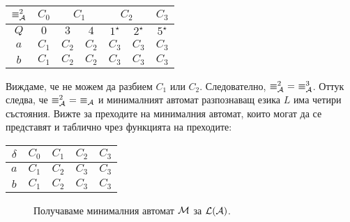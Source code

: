 \begin{extra2}
\begin{example}
\begin{itemize}
      \begin{tabular}{|c|c|c|c|c|c|c|}
        \hline
        $\equiv^2_{\mathcal{A}}$ & $C_0$ & \multicolumn{2}{|c|}{$C_1$} & \multicolumn{2}{|c|}{$C_2$} & $C_3$\\
        \hline
        \hline
        $Q$ & $0$ & $3$ & $4$ & $1^\star$ & $2^\star$ & $5^\star$ \\
        \hline
        $a$ & $C_1$& $C_2$ & $C_2$ & $C_3$ & $C_3$ & $C_3$\\
        \hline
        $b$ & $C_1$& $C_2$ & $C_2$ & $C_3$ & $C_3$ & $C_3$\\
        \hline
      \end{tabular}
      
      
      Виждаме, че не можем да разбием $C_1$ или $C_2$.
      Следователно, $\equiv^2_\A\ =\ \equiv^3_\A$.
      Оттук следва, че $\equiv^2_{\mathcal{A}}\ =\ \equiv_{\mathcal{A}}$ и минималният автомат разпознаващ езика $L$
      има четири състояния. Вижте  за преходите на минималния автомат,
      които могат да се представят и таблично чрез функцията на преходите:

      \begin{tabular}{|c|c|c|c|c|}
        \hline
        $\delta$ & $C_0$ & $C_1$ & $C_2$ & $C_3$ \\
        \hline
        $a$ & $C_1$ & $C_2$ & $C_3$ & $C_3$ \\
        \hline
        $b$ & $C_1$ & $C_2$ & $C_3$ & $C_3$ \\
        \hline
      \end{tabular}
    \end{itemize}

    \begin{figure}[H]
      \centering
      \caption{Получаваме минималния автомат $\mathcal{M}$ за $\mathcal{L}(\mathcal{A})$.}
      \label{fig:min2}
    \end{figure}
  \end{example}
\end{extra2}


